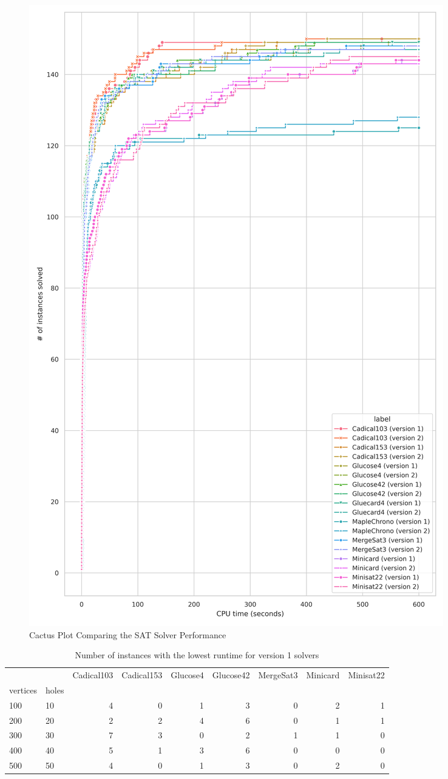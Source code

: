 \begin{figure}[htbp]
\centering
\includegraphics[scale=0.7]{Thesis/figures/minibenchmark_cactus_plot_runtime_SAT_with_holes.png}
\caption{Cactus Plot Comparing the SAT Solver Performance}
\label{fig:cactus_SAT}
\end{figure}

\begin{table}[htbp]
\tiny
\centering
\begin{tabular}{llrrrrrrr}
\toprule
 &  & Cadical103 & Cadical153 & Glucose4 & Glucose42 & MergeSat3 & Minicard & Minisat22 \\
vertices & holes &  &  &  &  &  &  &  \\
\midrule
100 & 10 & 4 & 0 & 1 & 3 & 0 & 2 & 1 \\
\cline{1-9}
200 & 20 & 2 & 2 & 4 & 6 & 0 & 1 & 1 \\
\cline{1-9}
300 & 30 & 7 & 3 & 0 & 2 & 1 & 1 & 0 \\
\cline{1-9}
400 & 40 & 5 & 1 & 3 & 6 & 0 & 0 & 0 \\
\cline{1-9}
500 & 50 & 4 & 0 & 1 & 3 & 0 & 2 & 0 \\
\cline{1-9}
\bottomrule
\end{tabular}
\caption{Number of instances with the lowest runtime for version 1 solvers}
\label{tab:SAT_small_time_v2}
\end{table}

